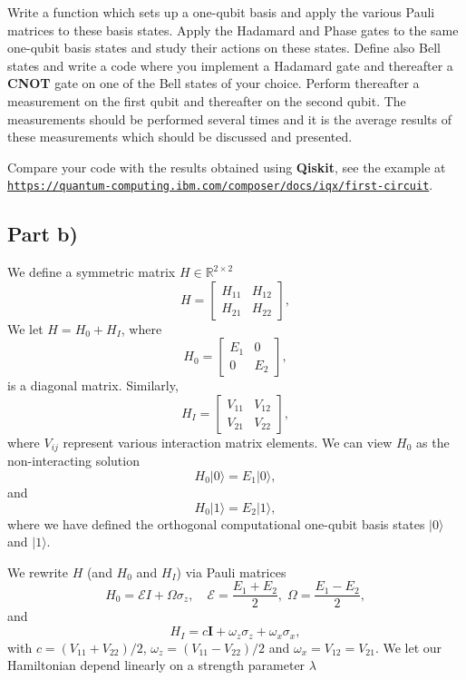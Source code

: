 \documentclass[%
oneside,                 %
final,                   %
10pt]{article}
\begin{document}
Write a function which sets up a one-qubit basis and apply the various
Pauli matrices to these basis states.  Apply the Hadamard and Phase
gates to the same one-qubit basis states and study their actions on
these states. Define also Bell states and write a code where you
implement a Hadamard gate and thereafter a \textbf{CNOT} gate on one of the Bell
states of your choice. Perform thereafter a measurement on the first qubit and
thereafter on the second qubit. The measurements should be performed 
several times and it is the average results of these measurements
which should be discussed and presented.

Compare your code with the results obtained using \textbf{Qiskit}, see the
example at
\href{{https://quantum-computing.ibm.com/composer/docs/iqx/first-circuit}}{\nolinkurl{https://quantum-computing.ibm.com/composer/docs/iqx/first-circuit}}.

\subsection*{Part b)}

We define a  symmetric matrix  $H\in {\mathbb{R}}^{2\times 2}$
\[
H = \begin{bmatrix} H_{11} & H_{12} \\ H_{21} & H_{22}
\end{bmatrix},
\]
We  let $H = H_0 + H_I$, where
\[
H_0= \begin{bmatrix} E_1 & 0 \\ 0 & E_2\end{bmatrix},
\]
is a diagonal matrix. Similarly,
\[
H_I= \begin{bmatrix} V_{11} & V_{12} \\ V_{21} & V_{22}\end{bmatrix},
\]
where $V_{ij}$ represent various interaction matrix elements.
We can view $H_0$ as the non-interacting solution
\begin{equation}
       H_0\vert 0 \rangle =E_1\vert 0 \rangle,
\end{equation}
and
\begin{equation}
       H_0\vert 1\rangle =E_2\vert 1\rangle,
\end{equation}
where we have defined the orthogonal computational one-qubit basis states $\vert 0\rangle$ and $\vert 1\rangle$.

We rewrite $H$ (and $H_0$ and $H_I$)  via Pauli matrices
\[
H_0 = \mathcal{E} I + \Omega \sigma_z, \quad \mathcal{E} = \frac{E_1
  + E_2}{2}, \; \Omega = \frac{E_1-E_2}{2},
\]
and
\[
H_I = c \bm{I} +\omega_z\sigma_z + \omega_x\sigma_x,
\]
with $c = (V_{11}+V_{22})/2$, $\omega_z = (V_{11}-V_{22})/2$ and $\omega_x = V_{12}=V_{21}$.
We let our Hamiltonian depend linearly on a strength parameter $\lambda$
\end{document}

